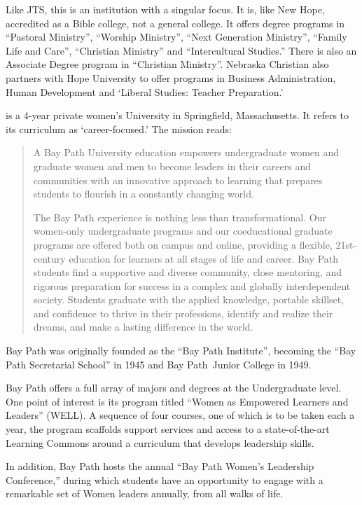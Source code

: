 Like JTS, this is an institution with a singular focus. It is, like New Hope, accredited as a Bible college, not a general college. It offers degree programs in ``Pastoral Ministry'', ``Worship Ministry'', ``Next Generation Ministry'', ``Family Life and Care'', ``Christian Ministry'' and ``Intercultural Studies.'' There is also an Associate Degree program in ``Christian Ministry''. Nebraska Christian also partners with Hope University to offer programs in Business Administration, Human Development and `Liberal Studies: Teacher Preparation.'

 is a 4-year private women's University in Springfield, Massachusetts. It refers to its curriculum as `career-focused.' The mission reads:

\begin{quote}

A Bay Path University education empowers undergraduate women and graduate women and men to become leaders in their careers and communities with an innovative approach to learning that prepares students to flourish in a constantly changing world.

The Bay Path experience is nothing less than transformational. Our women-only undergraduate programs and our coeducational graduate programs are offered both on campus and online, providing a flexible, 21st-century education for learners at all stages of life and career. Bay Path students find a supportive and diverse community, close mentoring, and rigorous preparation for success in a complex and globally interdependent society. Students graduate with the applied knowledge, portable skillset, and confidence to thrive in their professions, identify and realize their dreams, and make a lasting difference in the world.
\end{quote}

Bay Path was originally founded as the ``Bay Path Institute'', becoming the ``Bay Path Secretarial School'' in 1945 and Bay Path Junior College in 1949. 

Bay Path offers a full array of majors and degrees at the Undergraduate level. One point of interest is its program titled ``Women as Empowered Learners and Leaders'' (WELL). A sequence of four courses, one of which is to be taken each a year, the program scaffolds support services and access to a state-of-the-art Learning Commons around a curriculum that develops leadership skills.

In addition, Bay Path hosts the annual ``Bay Path Women's Leadership Conference,'' during which students have an opportunity to engage with a remarkable set of Women leaders annually, from all walks of life.

